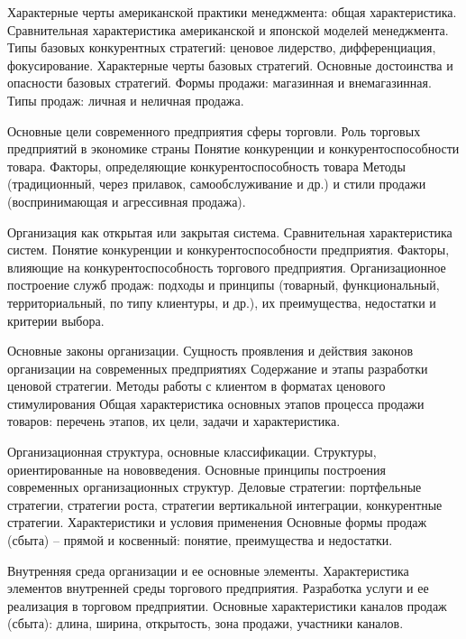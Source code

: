 \documentclass[
	11pt,
	a4paper,
	]
	{article}
\begin{document}
\bigskip

\noindent{} 
	{
		Характерные черты американской практики менеджмента: общая характеристика. Сравнительная характеристика американской и японской моделей менеджмента.
	}{
		Типы базовых конкурентных стратегий: ценовое лидерство, дифференциация, фокусирование. Характерные черты базовых стратегий. Основные достоинства и опасности базовых стратегий.
	}{
		Формы продажи: магазинная и внемагазинная. Типы продаж: личная и неличная продажа.
	}

\bigskip

\noindent{} 
	{
		Основные цели современного предприятия сферы торговли. Роль торговых предприятий в экономике страны
	}{
		Понятие конкуренции и конкурентоспособности товара. Факторы, определяющие конкурентоспособность товара
	}{
		Методы (традиционный, через прилавок, самообслуживание и др.) и стили продажи (воспринимающая и агрессивная продажа).
	}

\bigskip

\noindent{} 
	{
		Организация как открытая или закрытая система. Сравнительная характеристика систем.
	}{
		Понятие конкуренции и конкурентоспособности предприятия. Факторы, влияющие на конкурентоспособность торгового предприятия.
	}{
		Организационное построение служб продаж: подходы и принципы (товарный, функциональный, территориальный, по типу клиентуры, и др.), их преимущества, недостатки и критерии выбора.
	}

\bigskip

\noindent{} 
	{
		Основные законы организации. Сущность проявления и действия законов организации на современных предприятиях
	}{
		Содержание и этапы разработки ценовой стратегии. Методы работы с клиентом в форматах ценового стимулирования
	}{
		Общая характеристика основных этапов процесса продажи товаров: перечень этапов, их цели, задачи и характеристика.
	}

\bigskip

\noindent{} 
	{
		Организационная структура, основные классификации. Структуры, ориентированные на нововведения. Основные принципы построения современных организационных структур.
	}{
		Деловые стратегии: портфельные стратегии, стратегии роста, стратегии вертикальной интеграции, конкурентные стратегии. Характеристики и условия применения
	}{
		Основные формы продаж (сбыта) – прямой и косвенный: понятие, преимущества и недостатки.
	}

\bigskip

\noindent{} 
	{
		Внутренняя среда организации и ее основные элементы. Характеристика элементов внутренней среды торгового предприятия.
	}{
		Разработка услуги и ее реализация в торговом предприятии.
	}{
		Основные характеристики каналов продаж (сбыта): длина, ширина, открытость, зона продажи, участники каналов.
	}
\end{document}
